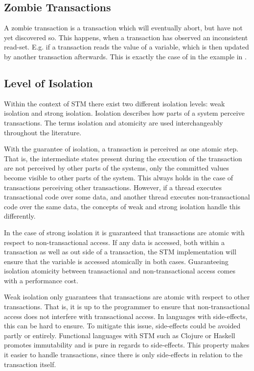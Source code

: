 \subsection{Zombie Transactions}
\label{subsec:zombie}
A zombie transaction is a transaction which will eventually abort, but have not yet discovered so. This happens, when a transaction has observed an inconsistent read-set\cite[p. 196]{dice2006transactional}. E.g. if a transaction reads the value of a variable, which is then updated by another transaction afterwards. This is exactly the case of  in the example in .

\subsection{Level of Isolation}
\label{subsec:isolation_level}
Within the context of \ac{STM} there exist two different isolation levels: weak isolation and strong isolation. Isolation describes how parts of a system perceive transactions. The terms isolation and atomicity are used interchangeably throughout the literature\cite[p. 30]{harris2010transactional}.

With the guarantee of isolation, a transaction is perceived as one atomic step. That is, the intermediate states present during the execution of the transaction are not perceived by other parts of the systems, only the committed values become visible to other parts of the system. This always holds in the case of transactions perceiving other transactions. However, if a thread executes transactional code over some data, and another thread executes non-transactional code over the same data, the concepts of weak and strong isolation handle this differently.

In the case of strong isolation it is guaranteed that transactions are atomic with respect to non-transactional access\cite[p. 2083]{herlihy2011tm}. If any data is accessed, both within a transaction as well as out side of a transaction, the \ac{STM} implementation will ensure that the variable is accessed atomically in both cases. Guaranteeing isolation atomicity between transactional and non-transactional access comes with a performance cost\cite{herlihy2011tm}. 

Weak isolation only guarantees that transactions are atomic with respect to other transactions. That is, it is up to the programmer to ensure that non-transactional access does not interfere with transactional access. In languages with side-effects, this can be hard to ensure. To mitigate this issue, side-effects could be avoided  partly or entirely. Functional languages with \ac{STM} such as Clojure or Haskell promotes immutability and is pure in regards to side-effects. This property makes it easier to handle transactions, since there is only side-effects in relation to the transaction itself. 

